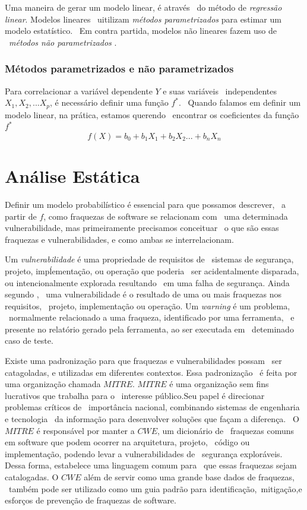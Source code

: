 Uma maneira de gerar um modelo linear, é através \
do método de \textit{regressão linear}.  Modelos lineares \
uitilizam \textit{métodos parametrizados} para estimar um modelo estatístico. \
Em contra partida, modelos não lineares fazem uso de \
\textit{métodos não parametrizados} \cite{Jordan}.

\subsubsection{Métodos parametrizados e não parametrizados}

Para correlacionar a variável dependente $Y$ e suas variáveis \
independentes $X_1,X_2,...X_p$, é necessário definir uma função $f^*$. \
Quando falamos em definir um modelo linear, na prática, estamos querendo \
encontrar os coeficientes da função $f^*$
\[
        f(X) = b_0 + b_1X_1 + b_2X_2 ... + b_nX_n
\]


\section{Análise Estática}
Definir um modelo probabilístico é essencial para que possamos descrever, \
a partir de $f$, como fraquezas de software se relacionam com \
uma determinada vulnerabilidade, mas primeiramente precisamos conceituar \
o que são essas fraquezas e vulnerabilidades, e como ambas se interrelacionam.

Um \textit{vulnerabilidade} é uma propriedade de requisitos de \
sistemas de segurança, projeto, impĺementação, ou operação que poderia \
ser acidentalmente disparada, ou intencionalmente explorada resultando \
em uma falha de segurança\cite{Okun}. Ainda segundo \cite{Okun}, \
uma vulnerabilidade é o resultado de uma ou mais fraquezas nos requisitos, \
projeto, implementação ou operação. Um \textit{warning} é um problema, \
normalmente relacionado a uma fraqueza, identificado por uma ferramenta, \
e presente no relatório gerado pela ferramenta, ao ser executada em \
deteminado caso de teste\cite{Okun}.


Existe uma padronização para que fraquezas e vulnerabilidades possam \
ser catagoladas, e utilizadas em diferentes contextos. Essa padronização \
é feita por uma organização chamada $MITRE$.
$MITRE$ é uma organização sem fins lucrativos que trabalha para o \
interesse público.Seu papel é direcionar problemas críticos de \
importância nacional, combinando sistemas de engenharia e tecnologia \
da informação para desenvolver soluções que façam a diferença\cite{Mitre}. \
O $MITRE$ é responsável por manter a $CWE$, um dicionário de \
fraquezas comuns em software que podem ocorrer na arquitetura, projeto, \
código ou implementação, podendo levar a vulnerabilidades de \
segurança exploráveis. Dessa forma, estabelece uma linguagem comum para \
que essas fraquezas sejam catalogadas.
O $CWE$ além de servir como uma grande base dados de fraquezas, \
também pode ser utilizado como um guia padrão para identificação,\
mitigação,e esforços de prevenção de fraquezas de software\cite{Mitre}.


